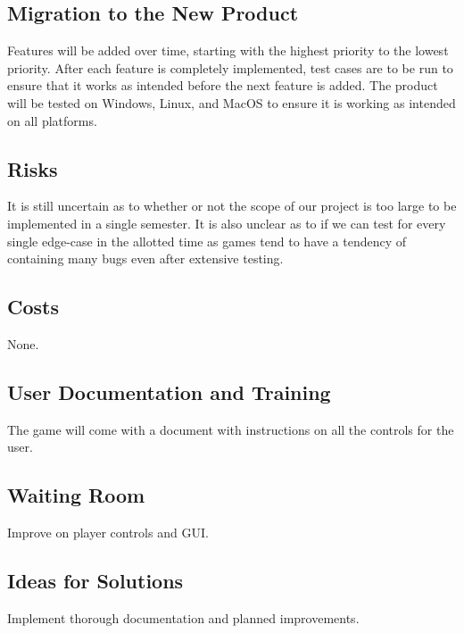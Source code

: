 \documentclass[12pt, titlepage]{article}
\begin{document}
\subsection{Migration to the New Product}
Features will be added over time, starting with the highest priority to the lowest priority. After each feature is completely implemented, test cases are to be run to ensure that it works as intended before the next feature is added. The product will be tested on Windows, Linux, and MacOS to ensure it is working as intended on all platforms.

\subsection{Risks}
It is still uncertain as to whether or not the scope of our project is too large to be implemented in a single semester. It is also unclear as to if we can test for every single edge-case in the allotted time as games tend to have a tendency of containing many bugs even after extensive testing.

\subsection{Costs}
None.

\subsection{User Documentation and Training}
The game will come with a document with instructions on all the controls for the user.

\subsection{Waiting Room}
Improve on player controls and GUI.

\subsection{Ideas for Solutions}
Implement thorough documentation and planned improvements.





\newpage
\end{document}
